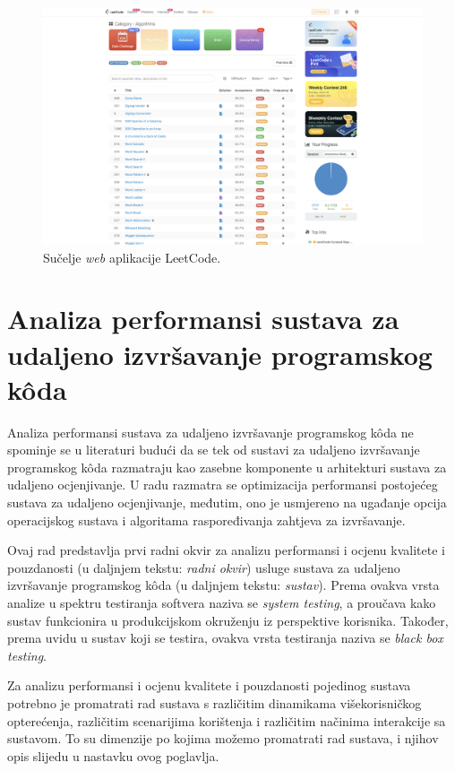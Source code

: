 \documentclass[times, utf8, diplomski]{fer}
\begin{document}
\begin{figure}[htb]
	\centering
	\includegraphics[width=\textwidth]{images/LeetCode UI.png}
	\caption{
		Sučelje \textit{web} aplikacije LeetCode.
	}
	\label{fig:leetcode-ui}
\end{figure}

\chapter{Analiza performansi sustava za udaljeno izvršavanje programskog kôda}
\label{chap:analysis}
Analiza performansi sustava za udaljeno izvršavanje programskog kôda ne spominje se u literaturi budući da se tek od \citep{9245310} sustavi za udaljeno izvršavanje programskog kôda razmatraju kao zasebne komponente u arhitekturi sustava za udaljeno ocjenjivanje. U radu \citep{drung2011enhance} razmatra se optimizacija performansi postojećeg sustava za udaljeno ocjenjivanje, međutim, ono je usmjereno na ugađanje opcija operacijskog sustava i algoritama raspoređivanja zahtjeva za izvršavanje.

Ovaj rad predstavlja prvi radni okvir za analizu performansi i ocjenu kvalitete i pouzdanosti (u daljnjem tekstu: \textit{radni okvir}) usluge sustava za udaljeno izvršavanje programskog kôda (u daljnjem tekstu: \textit{sustav}). Prema \citep{nidhra2012black} ovakva vrsta analize u spektru testiranja softvera naziva se \textit{system testing}, a proučava kako sustav funkcionira u produkcijskom okruženju iz perspektive korisnika. Također, prema uvidu u sustav koji se testira, ovakva vrsta testiranja naziva se \textit{black box testing}.

Za analizu performansi i ocjenu kvalitete i pouzdanosti pojedinog sustava potrebno je promatrati rad sustava s različitim dinamikama višekorisničkog opterećenja, različitim scenarijima korištenja i različitim načinima interakcije sa sustavom. To su dimenzije po kojima možemo promatrati rad sustava, i njihov opis slijedu u nastavku ovog poglavlja.
\end{document}
